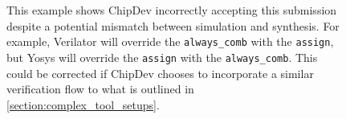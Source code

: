 
\begin{figure}[t]
    \centering
    \caption[
        Tricking ChipDev's simulators
    ]{
        This example shows ChipDev \cite{ChipDev} incorrectly accepting this submission despite a potential mismatch between simulation and synthesis. For example, Verilator will override the \texttt{always_comb} with the \texttt{assign}, but Yosys will override the \texttt{assign} with the \texttt{always_comb}. This could be corrected if ChipDev chooses to incorporate a similar verification flow to what is outlined in \autoref{section:complex_tool_setups}.
    }
    \label{fig:chipdev_hack}
\end{figure}
